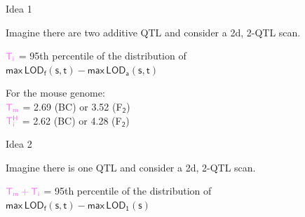 \documentclass[12pt]{article}
\newcommand{\headsize}{\fontsize{35}{35} \selectfont}
\newcommand{\smallersize}{\fontsize{20}{25} \selectfont}
\newcommand{\lod}{\text{LOD}}
\begin{document}
\newpage

\addtocounter{page}{-1}

\headsize \color{myyellow}
\hfill \begin{minipage}{5.75in}
\centering
Idea 1
\end{minipage}

\vspace{3cm} \color{mywhite} \smallersize

\hfill \begin{minipage}{10in}

Imagine there are two additive QTL and consider a 2d, 2-QTL scan.

\vspace{1cm}

\hspace*{0.5in} $\mathsf{\color{mypink} T_i}$ = 95th percentile of the
  distribution of \\[6pt]
\hspace*{1.3in} {\color{myblue} $\mathsf{ \text{max} \, \lod_f(s,t) -
    \text{max} \, \lod_a(s,t)}$}


\vspace{2cm}

For the mouse genome: \\[12pt]
\hspace*{0.5in} $\mathsf{\color{mypink} T_m}$ = {\color{myblue}
  2.69} (BC) or {\color{myblue} 3.52} (F$_{\mathsf{2}}$) \\[12pt]
\hspace*{0.5in} $\mathsf{\color{mypink} T^H_i}$ = {\color{myblue}
  2.62} (BC) or {\color{myblue} 4.28} (F$_{\mathsf{2}}$)


\end{minipage}



\newpage

\headsize \color{myyellow}
\hfill \begin{minipage}{5.75in}
\centering
Idea 2
\end{minipage}

\vspace{3cm} \color{mywhite} \smallersize

\hfill \begin{minipage}{10in}

Imagine there is one QTL and consider a 2d, 2-QTL scan.

\vspace{1cm}

\hspace*{0.5in} $\mathsf{\color{mypink} T_m + T_i}$ = 95th percentile of the
  distribution of \\[6pt]
\hspace*{2.0in} {\color{myblue} $\mathsf{ \text{max} \, \lod_f(s,t) -
    \text{max} \, \lod_1(s)}$}


\end{minipage}
\end{document}
